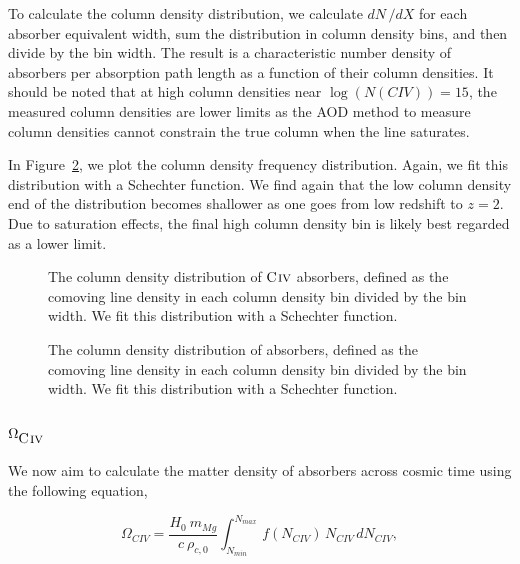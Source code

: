 
To calculate the column density distribution, we calculate $dN\,/dX$ for each absorber equivalent width, sum the distribution in column density bins, and then divide by the bin width. The result is a characteristic number density of {\CIV} absorbers per absorption path length as a function of their column densities. It should be noted that at high column densities near $\log (N(CIV)) = 15$, the measured column densities are lower limits as the AOD method to measure column densities cannot constrain the true column when the line saturates.

In Figure~\ref{fig:logndistro}, we plot the column density frequency distribution. Again, we fit this distribution with a Schechter function. We find again that the low column density end of the distribution becomes shallower as one goes from low redshift to $z = 2$. Due to saturation effects, the final high column density bin is likely best regarded as a lower limit.

\begin{figure*}[bth]
\caption{The column density distribution of ${\hbox{{\rm C}\kern 0.1em{\sc iv}}}$ absorbers, defined as the comoving line density in each column density bin divided by the bin width. We fit this distribution with a Schechter function.}
\label{fig:logndistrodndz}
\end{figure*}

\begin{figure*}[bth]
\caption{The column density distribution of {\CIV} absorbers, defined as the comoving line density in each column density bin divided by the bin width. We fit this distribution with a Schechter function.}
\label{fig:logndistro}
\end{figure*}

\subsection{$\Omega_{\hbox{{\rm C}\kern 0.1em{\sc iv}}}$}
\label{ch6:omega}


We now aim to calculate the matter density of {\CIV} absorbers across cosmic time using the following equation,

\begin{equation}
\Omega_{CIV} = \frac{H_0\  m_{Mg}}{c\ \rho_{c,0}} \int_{N_{min}}^{N_{max}}\, f (N_{CIV})\, N_{CIV}\, dN_{CIV} ,
\label{eqn:omega}
\end{equation}

